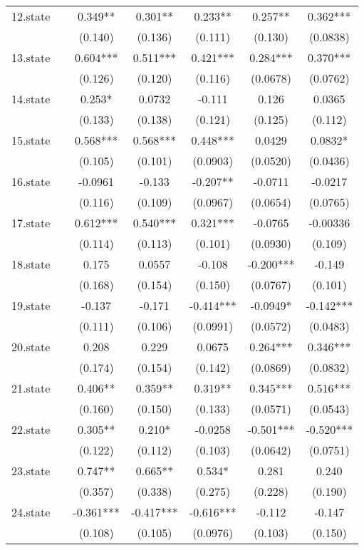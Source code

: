 \documentclass[]{article}
\begin{document}
\begin{tabular}{lcccccc}
12.state &  & 0.349** & 0.301** & 0.233** & 0.257** & 0.362*** \\
 &  & (0.140) & (0.136) & (0.111) & (0.130) & (0.0838) \\
13.state &  & 0.604*** & 0.511*** & 0.421*** & 0.284*** & 0.370*** \\
 &  & (0.126) & (0.120) & (0.116) & (0.0678) & (0.0762) \\
14.state &  & 0.253* & 0.0732 & -0.111 & 0.126 & 0.0365 \\
 &  & (0.133) & (0.138) & (0.121) & (0.125) & (0.112) \\
15.state &  & 0.568*** & 0.568*** & 0.448*** & 0.0429 & 0.0832* \\
 &  & (0.105) & (0.101) & (0.0903) & (0.0520) & (0.0436) \\
16.state &  & -0.0961 & -0.133 & -0.207** & -0.0711 & -0.0217 \\
 &  & (0.116) & (0.109) & (0.0967) & (0.0654) & (0.0765) \\
17.state &  & 0.612*** & 0.540*** & 0.321*** & -0.0765 & -0.00336 \\
 &  & (0.114) & (0.113) & (0.101) & (0.0930) & (0.109) \\
18.state &  & 0.175 & 0.0557 & -0.108 & -0.200*** & -0.149 \\
 &  & (0.168) & (0.154) & (0.150) & (0.0767) & (0.101) \\
19.state &  & -0.137 & -0.171 & -0.414*** & -0.0949* & -0.142*** \\
 &  & (0.111) & (0.106) & (0.0991) & (0.0572) & (0.0483) \\
20.state &  & 0.208 & 0.229 & 0.0675 & 0.264*** & 0.346*** \\
 &  & (0.174) & (0.154) & (0.142) & (0.0869) & (0.0832) \\
21.state &  & 0.406** & 0.359** & 0.319** & 0.345*** & 0.516*** \\
 &  & (0.160) & (0.150) & (0.133) & (0.0571) & (0.0543) \\
22.state &  & 0.305** & 0.210* & -0.0258 & -0.501*** & -0.520*** \\
 &  & (0.122) & (0.112) & (0.103) & (0.0642) & (0.0751) \\
23.state &  & 0.747** & 0.665** & 0.534* & 0.281 & 0.240 \\
 &  & (0.357) & (0.338) & (0.275) & (0.228) & (0.190) \\
24.state &  & -0.361*** & -0.417*** & -0.616*** & -0.112 & -0.147 \\
 &  & (0.108) & (0.105) & (0.0976) & (0.103) & (0.150) \\

\end{tabular}
\end{document}

